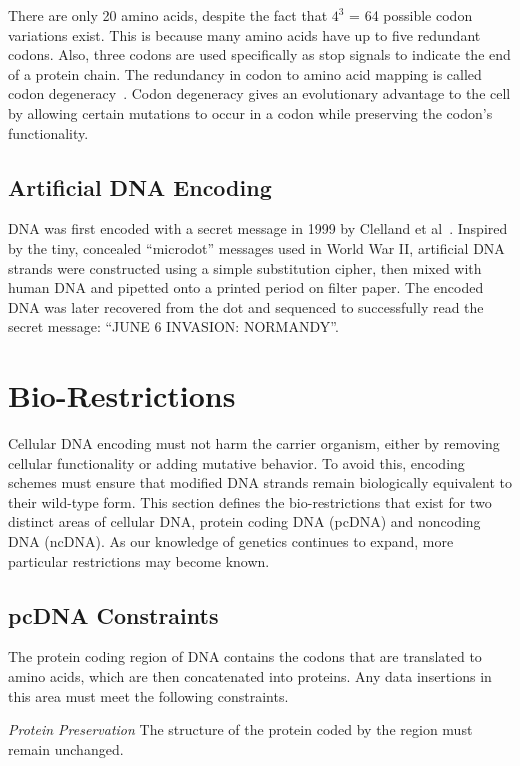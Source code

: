 \documentclass[USenglish,oneside,twocolumn]{article}
\begin{document}
There are only 20 amino acids, despite the fact that $4^3$ = 64 possible codon variations exist. This is because many amino acids have up to five redundant codons. Also, three codons are used specifically as stop signals to indicate the end of a protein chain. The redundancy in codon to amino acid mapping is called codon degeneracy~\cite{WBBGLL2008}. Codon degeneracy gives an evolutionary advantage to the cell by allowing certain mutations to occur in a codon while preserving the codon’s functionality.

\subsection{Artificial DNA Encoding}

 DNA was first encoded with a secret message in 1999 by Clelland et al~\cite{CRB1999N}. Inspired by the tiny, concealed “microdot” messages used in World War II, artificial DNA strands were constructed using a simple substitution cipher, then mixed with human DNA and pipetted onto a printed period on filter paper. The encoded DNA was later recovered from the dot and sequenced to successfully read the secret message: “JUNE 6 INVASION: NORMANDY”.

\section{Bio-Restrictions}

Cellular DNA encoding must not harm the carrier organism, either by removing cellular functionality or adding mutative behavior. To avoid this, encoding schemes must ensure that modified DNA strands remain biologically equivalent to their wild-type form. This section defines the bio-restrictions that exist for two distinct areas of cellular DNA, protein coding DNA (pcDNA) and noncoding DNA (ncDNA). As our knowledge of genetics continues to expand, more particular restrictions may become known.

\subsection{pcDNA Constraints}

The protein coding region of DNA contains the codons that are translated to amino acids, which are then concatenated into proteins. Any data insertions in this area must meet the following constraints.

\textit{Protein Preservation} The structure of the protein coded by the region must remain unchanged.
\end{document}

